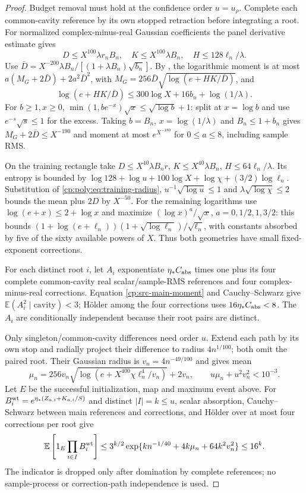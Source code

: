 \begin{proof}
Budget removal must hold at the confidence order $u=u_\rho$.
Complete each common-cavity reference by its own stopped retraction
before integrating a root. For normalized complex-minus-real Gaussian
coefficients the panel derivative estimate gives
\[
D\le X^{100}\lambda r_nB_n,\quad K\le X^{100}\lambda B_n,\quad
H\le128\ell_n/\lambda.
\]
Use $\bar D=X^{-200}\lambda B_n/[(1+\lambda B_n)\sqrt{b_n}]$.
By , the logarithmic moment is at most
$a(M_G+2\bar D)+2a^2\bar D^2$, with
$M_G=256\bar D\sqrt{\log(e+HK/\bar D)}$, and
\[
\log(e+HK/\bar D)\le300\log X+16b_n+\log(1/\lambda).
\]
For $b\ge1,x\ge0$,
$\min(1,be^{-x})\sqrt x\le\sqrt{\log b}+1$:
split at $x=\log b$ and use $e^{-s}\sqrt s\le1$ for the excess.
Taking $b=B_n$, $x=\log(1/\lambda)$ and $B_n\le1+b_n$ gives
$M_G+2\bar D\le X^{-190}$ and moment at most $e^{X^{-180}}$
for $0\le a\le8$, including sample RMS.

On the training rectangle take
$D\le X^{40}\lambda B_nr$, $K\le X^{40}\lambda B_n$,
$H\le64\ell_n/\lambda$. Its entropy is bounded by
$\log128+\log u+100\log X+\log\chi+(3/2)\log\ell_n$.
Substitution of \eqref{cp:poly:eq:training-radius},
$u^{-1}\sqrt{\log u}\le1$ and $\lambda\sqrt{\log\chi}\le2$
bounds the mean plus $2D$ by $X^{-50}$.
For the remaining logarithms use
$\log(e+x)\le2+\log x$ and maximize
$(\log x)^a/\sqrt x$, $a=0,1/2,1,3/2$:
this bounds
$(1+\log(e+\ell_n))(1+\sqrt{\log\ell_n})/\sqrt{\ell_n}$,
with constants absorbed by five of the sixty available powers of $X$.
Thus both geometries have small fixed-exponent corrections.

For each distinct root $i$, let $A_i$ exponentiate
$\eta_*C_{\rm abs}$ times one plus its four complete common-cavity
real scalar/sample-RMS references and four complex-minus-real corrections.
Equation \eqref{cp:src-main-moment} and Cauchy--Schwarz give
$\mathbb E(A_i^2\mid\text{cavity})<3$; Hölder among the four
corrections uses $16\eta_*C_{\rm abs}<8$.
The $A_i$ are conditionally independent because their root pairs are distinct.

Only singleton/common-cavity differences need order $u$.
Extend each path by its own stop and radially project their difference to
radius $4n^{1/100}$; both omit the paired root. Their Gaussian radius is
$v_n=4n^{-49/100}$ and  gives mean
\[
\mu_n=256v_n\sqrt{\log(e+X^{400}\chi\ell_n^4/v_n)}+2v_n,
\qquad u\mu_n+u^2v_n^2<10^{-3}.
\]
Let $E$ be the successful initialization, map and maximum event above.
For $B_i^{\rm wt}=e^{\eta_*(Z_{a,i}+K_{a,i}/S)}$ and distinct
$|I|=k\le u$, scalar absorption, Cauchy--Schwarz between main references
and corrections, and Hölder over at most four corrections per root give
\[
\mathbb E\left[1_E\prod_{i\in I}B_i^{\rm wt}\right]
 \le3^{k/2}\exp\{kn^{-1/40}+4k\mu_n+64k^2v_n^2\}\le16^k.
\]
The indicator is dropped only after domination by complete references;
no sample-process or correction-path independence is used.


\end{proof}
